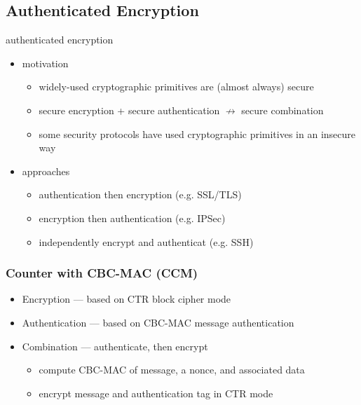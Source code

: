 \documentclass[draft]{article}
\begin{document}
\subsection{Authenticated Encryption}
\glsdesc{authenticated encryption}
\begin{itemize}[nosep]
    \item motivation
          \begin{itemize}[nosep]
              \item widely-used cryptographic primitives are (almost always) secure
              \item secure encryption + secure authentication $\not\rightarrow$ secure combination
              \item some security protocols have used cryptographic primitives in an insecure way
          \end{itemize}
    \item approaches
          \begin{itemize}[nosep]
              \item authentication then encryption (e.g. SSL/TLS)
              \item encryption then authentication (e.g. IPSec)
              \item independently encrypt and authenticat (e.g. SSH)
          \end{itemize}
\end{itemize}
\subsubsection{Counter with CBC-MAC (CCM)}
\begin{itemize}[nosep]
    \item Encryption --- based on CTR block cipher mode
    \item Authentication --- based on CBC-MAC message authentication
    \item Combination --- authenticate, then encrypt
          \begin{itemize}[nosep]
              \item compute CBC-MAC of message, a nonce, and associated data
              \item encrypt message and authentication tag in CTR mode
          \end{itemize}
\end{itemize}
\end{document}

